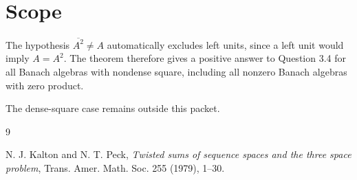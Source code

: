 \documentclass[11pt]{article}
\newcommand{\cl}{\overline}
\begin{document}
\section*{Scope}

The hypothesis \(\cl{A^2}\ne A\) automatically excludes left units, since a
left unit would imply \(A=A^2\). The theorem therefore gives a positive answer
to Question 3.4 for all Banach algebras with nondense square, including all
nonzero Banach algebras with zero product.

The dense-square case remains outside this packet.

\begin{thebibliography}{9}

N. J. Kalton and N. T. Peck,
\emph{Twisted sums of sequence spaces and the three space problem},
Trans. Amer. Math. Soc. 255 (1979), 1--30.

\end{thebibliography}
\end{document}
